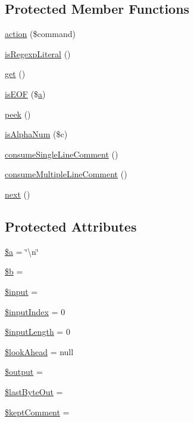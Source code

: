 \subsection*{Protected Member Functions}
\begin{DoxyCompactItemize}
\item 
\hyperlink{classJSMin_afecad9e791629529f6b379bd7b20a4e4}{action} (\$command)
\item 
\hyperlink{classJSMin_a487b4b073a8319123317d776feb72f6f}{is\+Regexp\+Literal} ()
\item 
\hyperlink{classJSMin_adcd5b6e8efc1792816812168118f49ef}{get} ()
\item 
\hyperlink{classJSMin_a450a0756edbd9508745f90ccacd08a27}{is\+E\+O\+F} (\$\hyperlink{Shape_8php_a868083704107d6d05b69983f62cce171}{a})
\item 
\hyperlink{classJSMin_ac786ee1b9552762de8fbc7a3a1c22070}{peek} ()
\item 
\hyperlink{classJSMin_af54ff87064c2b9f19e4905e511fc83e5}{is\+Alpha\+Num} (\$c)
\item 
\hyperlink{classJSMin_ad7f3a27d59bdb92db013a336b1c64f3a}{consume\+Single\+Line\+Comment} ()
\item 
\hyperlink{classJSMin_a1bda4db9c558409b8bfc75279a42ca8a}{consume\+Multiple\+Line\+Comment} ()
\item 
\hyperlink{classJSMin_a3c4b356d81d5e5ede03f43cf2aec9037}{next} ()
\end{DoxyCompactItemize}
\subsection*{Protected Attributes}
\begin{DoxyCompactItemize}
\item 
\hyperlink{classJSMin_a2386c0978ac70ac8e9bd592fca835e82}{\$a} = \char`\"{}\textbackslash{}n\char`\"{}
\item 
\hyperlink{classJSMin_aafa0d83dd06ede16a81de0441c5eb1ad}{\$b} = \textquotesingle{}\textquotesingle{}
\item 
\hyperlink{classJSMin_afc2d10997a7e61c31cc9ed70e414829b}{\$input} = \textquotesingle{}\textquotesingle{}
\item 
\hyperlink{classJSMin_a4f772e961c1cd23e3baa6486a2952236}{\$input\+Index} = 0
\item 
\hyperlink{classJSMin_adc61bf642369b9d96e4844b2e694cf76}{\$input\+Length} = 0
\item 
\hyperlink{classJSMin_ad78bd58d8c2f93286068d85abc0afb57}{\$look\+Ahead} = null
\item 
\hyperlink{classJSMin_ab1b9cc7015da8bc3e3cc5edbc60f0ac2}{\$output} = \textquotesingle{}\textquotesingle{}
\item 
\hyperlink{classJSMin_aa33e5c3fabce5f410b11880757bd6521}{\$last\+Byte\+Out} = \textquotesingle{}\textquotesingle{}
\item 
\hyperlink{classJSMin_ac9f663a3d896ddbce3262eae7f777e94}{\$kept\+Comment} = \textquotesingle{}\textquotesingle{}
\end{DoxyCompactItemize}



